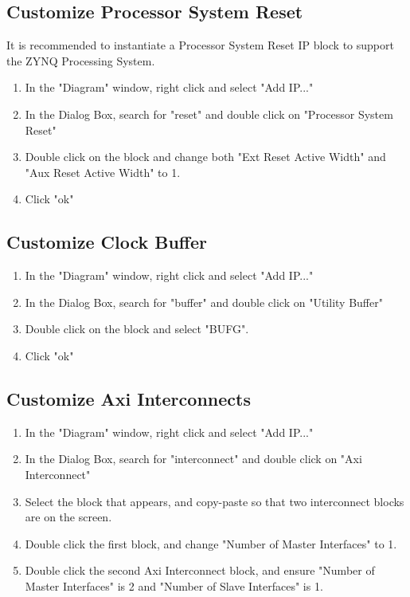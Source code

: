 \documentclass[12pt]{article}
\begin{document}
\subsection{Customize Processor System Reset} It is recommended to instantiate a Processor System Reset IP block to support the ZYNQ Processing System.
\begin{enumerate}
\item In the "Diagram" window, right click and select "Add IP..."
\item In the Dialog Box, search for "reset" and double click on "Processor System Reset"
\item Double click on the block and change both "Ext Reset Active Width" and "Aux Reset Active Width" to 1.
\item Click "ok"
\end{enumerate}

\subsection{Customize Clock Buffer}
\begin{enumerate}
\item In the "Diagram" window, right click and select "Add IP..."
\item In the Dialog Box, search for "buffer" and double click on "Utility Buffer"
\item Double click on the block and select "BUFG".
\item Click "ok"
\end{enumerate}

\subsection{Customize Axi Interconnects}
\begin{enumerate}
\item In the "Diagram" window, right click and select "Add IP..."
\item In the Dialog Box, search for "interconnect" and double click on "Axi Interconnect"
\item Select the block that appears, and copy-paste so that two interconnect blocks are on the screen.
\item Double click the first block, and change "Number of Master Interfaces" to 1.
\item Double click the second Axi Interconnect block, and ensure "Number of Master Interfaces" is 2 and "Number of Slave Interfaces" is 1.
\end{enumerate}
\end{document}
